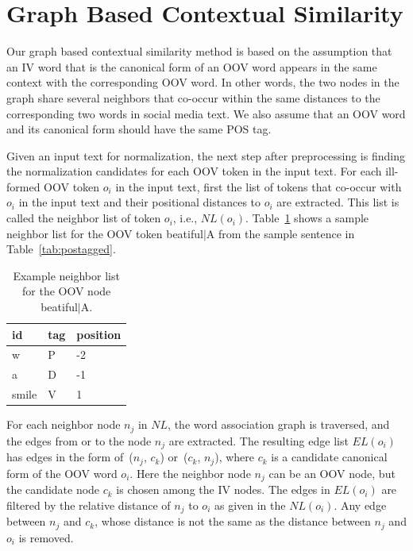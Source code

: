 \documentclass[a4paper,onesided,12pt]{report}
\begin{document}
\section{Graph Based Contextual Similarity}

Our graph based contextual similarity method is based on the assumption that an IV word that is the canonical form of an OOV word appears in the same context with the corresponding OOV word. In other words, the two nodes in the graph share several neighbors that co-occur within the same distances to the corresponding two words in social media text. We also assume that an OOV word and its canonical form should have the same POS tag.

Given an input text for normalization, the next step after preprocessing is finding the normalization candidates for each OOV token in the input text. For each ill-formed OOV token $o_i$ in the input text, first the list of tokens that co-occur with $o_i$ in the input text and their positional distances to $o_i$ are extracted.  This list is called the neighbor list of token $o_i$, i.e.,  $NL(o_i)$. Table~\ref{tab:neigh} shows a sample neighbor list for the OOV token beatiful$|$A from the sample sentence in Table~\ref{tab:postagged}.

\begin{table}[hbt]
\caption{Example neighbor list for the OOV node beatiful$|$A.}
\centering
\begin{tabular}{|l|l|l|}
    \hline
    \textbf{id} & \textbf{tag} & \textbf{position} \\
    \hline
    w & P & -2 \\     \hline
    a & D & -1 \\     \hline
    smile & V & 1 \\     \hline
  \end{tabular}
\label{tab:neigh}
\end{table}

For each neighbor node $n_{j}$ in $NL$, the word association graph is traversed, and the edges from or to the node $n_{j}$ are extracted. The resulting edge list $EL(o_i)$ has edges in the form of~($n_{j}$, $c_{k}$) or~($c_{k}$, $n_{j}$), where $c_{k}$ is a candidate canonical form of the OOV word $o_i$.
Here the neighbor node $n_{j}$ can be an OOV node, but the candidate node $c_{k}$ is chosen among the IV nodes.
The edges in $EL(o_i)$ are filtered by the relative distance of $n_{j}$ to $o_i$ as given in the $NL(o_i)$. Any edge between  $n_{j}$ and $c_{k}$, whose distance is not the same as the distance between $n_{j}$ and $o_i$ is removed.
\end{document}
